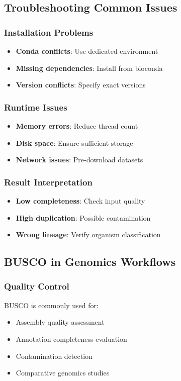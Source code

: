 \subsection{Troubleshooting Common Issues}

\subsubsection{Installation Problems}
\begin{itemize}
    \item \textbf{Conda conflicts}: Use dedicated environment
    \item \textbf{Missing dependencies}: Install from bioconda
    \item \textbf{Version conflicts}: Specify exact versions
\end{itemize}

\subsubsection{Runtime Issues}
\begin{itemize}
    \item \textbf{Memory errors}: Reduce thread count
    \item \textbf{Disk space}: Ensure sufficient storage
    \item \textbf{Network issues}: Pre-download datasets
\end{itemize}

\subsubsection{Result Interpretation}
\begin{itemize}
    \item \textbf{Low completeness}: Check input quality
    \item \textbf{High duplication}: Possible contamination
    \item \textbf{Wrong lineage}: Verify organism classification
\end{itemize}

\subsection{BUSCO in Genomics Workflows}

\subsubsection{Quality Control}
BUSCO is commonly used for:
\begin{itemize}
    \item Assembly quality assessment
    \item Annotation completeness evaluation
    \item Contamination detection
    \item Comparative genomics studies
\end{itemize}

